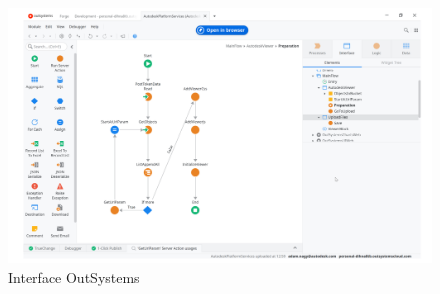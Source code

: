\begin{figure}[H]
    \centering
    \includegraphics[width=15cm]{Figures/outsystems.png}
    \caption{Interface OutSystems}
    \label{outsys} %
\end{figure}

